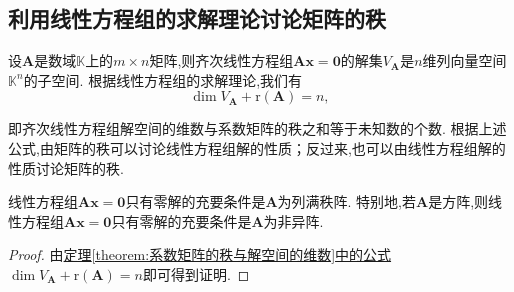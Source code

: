 \documentclass[../../main.tex]{subfiles}%
\begin{document}
\subsection{利用线性方程组的求解理论讨论矩阵的秩}

\begin{theorem}\label{theorem:系数矩阵的秩与解空间的维数}
设\(\boldsymbol{A}\)是数域\(\mathbb{K}\)上的\(m\times n\)矩阵,则齐次线性方程组\(\boldsymbol{A}\boldsymbol{x}=\boldsymbol{0}\)的解集\(V_{\boldsymbol{A}}\)是\(n\)维列向量空间\(\mathbb{K}^n\)的子空间. 根据线性方程组的求解理论,我们有
\[
\dim V_{\boldsymbol{A}}+\mathrm{r}(\boldsymbol{A}) = n,
\]
\end{theorem}
\begin{note}
即齐次线性方程组解空间的维数与系数矩阵的秩之和等于未知数的个数. 根据上述公式,由矩阵的秩可以讨论线性方程组解的性质；反过来,也可以由线性方程组解的性质讨论矩阵的秩. 
\end{note}

\begin{corollary}\label{corollary:线性方程组只有零解的充要条件}
线性方程组\(\boldsymbol{A}\boldsymbol{x}=\boldsymbol{0}\)只有零解的充要条件是\(\boldsymbol{A}\)为列满秩阵. 特别地,若\(\boldsymbol{A}\)是方阵,则线性方程组\(\boldsymbol{A}\boldsymbol{x}=\boldsymbol{0}\)只有零解的充要条件是\(\boldsymbol{A}\)为非异阵. 
\end{corollary}
\begin{proof}
由\hyperref[theorem:系数矩阵的秩与解空间的维数]{定理\ref{theorem:系数矩阵的秩与解空间的维数}中的公式}\(\dim V_{\boldsymbol{A}}+\mathrm{r}(\boldsymbol{A}) = n\)即可得到证明.
\end{proof}
\end{document}
